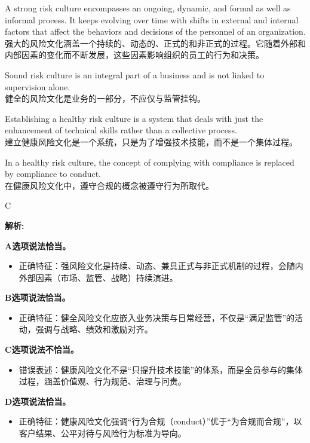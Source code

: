 \documentclass{article}
\newenvironment{explanation}
{\textbf{解析:}\par}
{\par}
\begin{document}
\begin{choices}
    \item A strong risk culture encompasses an ongoing, dynamic, and formal as well as informal process. It keeps evolving over time with shifts in external and internal factors that affect the behaviors and decisions of the personnel of an organization.\\强大的风险文化涵盖一个持续的、动态的、正式的和非正式的过程。它随着外部和内部因素的变化而不断发展，这些因素影响组织的员工的行为和决策。
    \item Sound risk culture is an integral part of a business and is not linked to supervision alone.\\健全的风险文化是业务的一部分，不应仅与监管挂钩。
    \item Establishing a healthy risk culture is a system that deals with just the enhancement of technical skills rather than a collective process.\\建立健康风险文化是一个系统，只是为了增强技术技能，而不是一个集体过程。
    \item In a healthy risk culture, the concept of complying with compliance is replaced by compliance to conduct.\\在健康风险文化中，遵守合规的概念被遵守行为所取代。
\end{choices}

\begin{correctanswer}
    C
\end{correctanswer}
\begin{explanation}
    \textbf{A选项说法恰当。}
    \begin{itemize}
        \item 正确特征：强风险文化是持续、动态、兼具正式与非正式机制的过程，会随内外部因素（市场、监管、战略）持续演进。
    \end{itemize}

    \textbf{B选项说法恰当。}
    \begin{itemize}
        \item 正确特征：健全风险文化应嵌入业务决策与日常经营，不仅是“满足监管”的活动，强调与战略、绩效和激励对齐。
    \end{itemize}

    \textbf{C选项说法不恰当。}
    \begin{itemize}
        \item 错误表述：健康风险文化不是“只提升技术技能”的体系，而是全员参与的集体过程，涵盖价值观、行为规范、治理与问责。
    \end{itemize}

    \textbf{D选项说法恰当。}
    \begin{itemize}
        \item 正确特征：健康风险文化强调“行为合规（conduct）”优于“为合规而合规”，以客户结果、公平对待与风险行为标准为导向。
    \end{itemize}
\end{explanation}
\end{document}
